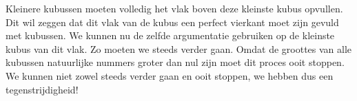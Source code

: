 

Kleinere kubussen moeten volledig het vlak boven deze kleinste kubus opvullen. Dit wil zeggen dat dit vlak van de kubus een perfect vierkant moet zijn gevuld met kubussen. We kunnen nu de zelfde argumentatie gebruiken op de kleinste kubus van dit vlak. Zo moeten we steeds verder gaan. Omdat de groottes van alle kubussen natuurlijke nummers groter dan nul zijn moet dit proces ooit stoppen. We kunnen niet zowel steeds verder gaan en ooit stoppen, we hebben dus een tegenstrijdigheid!








